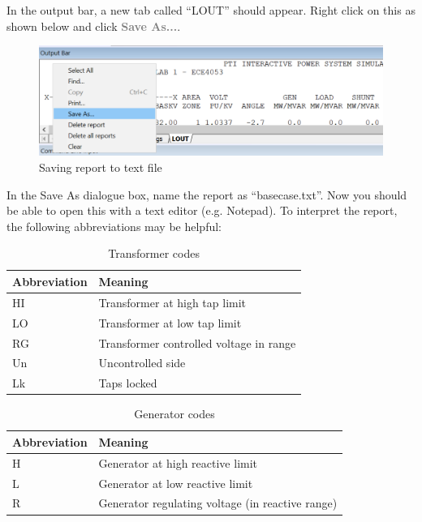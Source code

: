 \documentclass[paper=a4, fontsize=11pt]{article}
\begin{document}
In the output bar, a new tab called ``LOUT'' should appear. Right click on this as shown below and click \textbf{\textcolor{gray}{Save As...}}.

\begin{figure}[h]
\centering
\includegraphics[scale=0.32]{fig6_lout.pdf}
\caption{Saving report to text file}
\label{fig:6}
\end{figure}


In the Save As dialogue box, name the report as ``basecase.txt''. Now you should be able to open this with a text editor (e.g. Notepad). To interpret the report, the following abbreviations may be helpful:

\begin{table}[h]
\caption{Transformer codes}
\centering
\begin{tabular}{|l|l|}
\hline
\textbf{Abbreviation} & \textbf{Meaning}                        \\ \hline
HI                    & Transformer at high tap limit           \\ \hline
LO                    & Transformer at low tap limit            \\ \hline
RG                    & Transformer controlled voltage in range \\ \hline
Un                    & Uncontrolled side                       \\ \hline
Lk                    & Taps locked                             \\ \hline
\end{tabular}
\label{table:1}
\end{table}

\begin{table}[h]
\caption{Generator codes}
\centering
\begin{tabular}{|l|l|}
\hline
\textbf{Abbreviation} & \textbf{Meaning}                                 \\ \hline
H                     & Generator at high reactive limit                 \\ \hline
L                     & Generator at low reactive limit                  \\ \hline
R                     & Generator regulating voltage (in reactive range) \\ \hline
\end{tabular}
\label{table:2}
\end{table}
\end{document}
